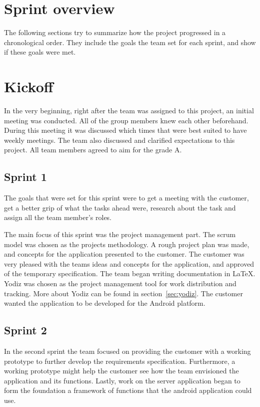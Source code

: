 \section{Sprint overview}
The following sections try to summarize how the project progressed in a chronological order. They include the goals the team set for each sprint, and show if these goals were met.

\section{Kickoff}
In the very beginning, right after the team was assigned to this project, an initial meeting was conducted. All of the group members knew each other beforehand. During this meeting it was discussed which times that were best suited to have weekly meetings. The team also discussed and clarified expectations to this project. All team members agreed to aim for the grade A.

\subsection{Sprint 1}
The goals that were set for this sprint were to get a meeting with the customer, get a better grip of what the tasks ahead were, research about the task and assign all the team member's roles.

The main focus of this sprint was the project management part. The scrum model was chosen as the projects methodology. A rough project plan was made, and concepts for the application presented to the customer. The customer was very pleased with the teams ideas and concepts for the application, and approved of the temporary specification. The team began writing documentation in \LaTeX. Yodiz was chosen as the project management tool for work distribution and tracking. More about Yodiz can be found in section~\ref{sec:yodiz}. The customer wanted the application to be developed for the Android platform.

\subsection{Sprint 2}
In the second sprint the team focused on providing the customer with a working
prototype to further develop the requirements specification. Furthermore, a
working prototype might help the customer see how the team envisioned the application
and its functions. Lastly, work on the server application began to form the
foundation a framework of functions that the android application could use.


